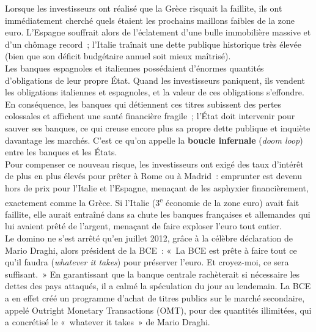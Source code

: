 \begin{example}
  Lorsque les investisseurs ont réalisé que la Grèce risquait la faillite, ils
  ont immédiatement cherché quels étaient les prochains maillons faibles de la
  zone euro. L'Espagne souffrait alors de l'éclatement d'une bulle immobilière
  massive et d'un chômage record~; l'Italie traînait une dette publique
  historique très élevée (bien que son déficit budgétaire annuel soit mieux
  maîtrisé).\\

  Les banques espagnoles et italiennes possédaient d'énormes quantités
  d'obligations de leur propre État. Quand les investisseurs paniquent, ils
  vendent les obligations italiennes et espagnoles, et la valeur de ces
  obligations s'effondre. En conséquence, les banques qui détiennent ces titres
  subissent des pertes colossales et affichent une santé financière fragile~;
  l'État doit intervenir pour sauver ses banques, ce qui creuse encore plus sa
  propre dette publique et inquiète davantage les marchés. C'est ce qu'on
  appelle la \textbf{boucle infernale} (\textit{doom loop}) entre les banques
  et les États.\\

  Pour compenser ce nouveau risque, les investisseurs ont exigé des taux
  d'intérêt de plus en plus élevés pour prêter à Rome ou à Madrid~: emprunter
  est devenu hors de prix pour l'Italie et l'Espagne, menaçant de les asphyxier
  financièrement, exactement comme la Grèce. Si l'Italie
  (3\textsuperscript{e} économie de la zone euro) avait fait faillite, elle
  aurait entraîné dans sa chute les banques françaises et allemandes qui lui
  avaient prêté de l'argent, menaçant de faire exploser l'euro tout entier.\\

  Le domino ne s'est arrêté qu'en juillet 2012, grâce à la célèbre déclaration
  de Mario Draghi, alors président de la BCE~: «~La BCE est prête à faire tout
  ce qu'il faudra (\emph{whatever it takes}) pour préserver l'euro. Et
  croyez-moi, ce sera suffisant.~» En garantissant que la banque centrale
  rachèterait si nécessaire les dettes des pays attaqués, il a calmé la
  spéculation du jour au lendemain. La BCE a en effet créé un programme d'achat
  de titres publics sur le marché secondaire, appelé Outright Monetary
  Transactions (OMT), pour des quantités illimitées, qui a concrétisé le
  «~whatever it takes~» de Mario Draghi.
\end{example}

